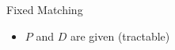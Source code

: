 \begin{frame}{Fixed Matching}
\begin{itemize}
  \item $P$ and $D$ are given (tractable)
\end{itemize}
\vfill 
\centering
\scalebox{.90}{

}
\end{frame}